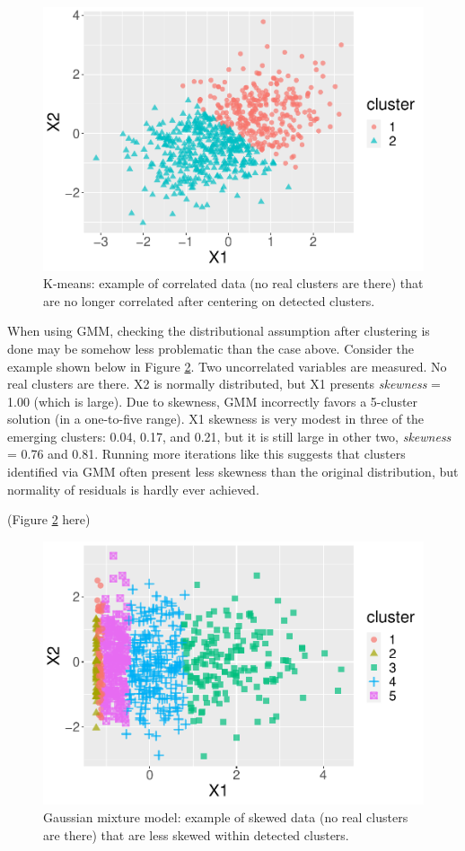 \documentclass[
  man,floatsintext]{apa7}
\begin{document}
\begin{figure}

{\centering \includegraphics[width=0.7\linewidth]{paper_files/figure-latex/figure-kmeans-assumptions-1} 

}

\caption{K-means: example of correlated data (no real clusters are there) that are no longer correlated after centering on detected clusters.}\label{fig:figure-kmeans-assumptions}
\end{figure}

When using GMM, checking the distributional assumption after clustering is done may be somehow less problematic than the case above. Consider the example shown below in Figure \ref{fig:figure-gmm-assumptions}. Two uncorrelated variables are measured. No real clusters are there. X2 is normally distributed, but X1 presents \emph{skewness} = 1.00 (which is large). Due to skewness, GMM incorrectly favors a 5-cluster solution (in a one-to-five range). X1 skewness is very modest in three of the emerging clusters: 0.04, 0.17, and 0.21, but it is still large in other two, \emph{skewness} = 0.76 and 0.81. Running more iterations like this suggests that clusters identified via GMM often present less skewness than the original distribution, but normality of residuals is hardly ever achieved.

(Figure \ref{fig:figure-gmm-assumptions} here)

\begin{figure}

{\centering \includegraphics[width=0.7\linewidth]{paper_files/figure-latex/figure-gmm-assumptions-1} 

}

\caption{Gaussian mixture model: example of skewed data (no real clusters are there) that are less skewed within detected clusters.}\label{fig:figure-gmm-assumptions}
\end{figure}
\end{document}

